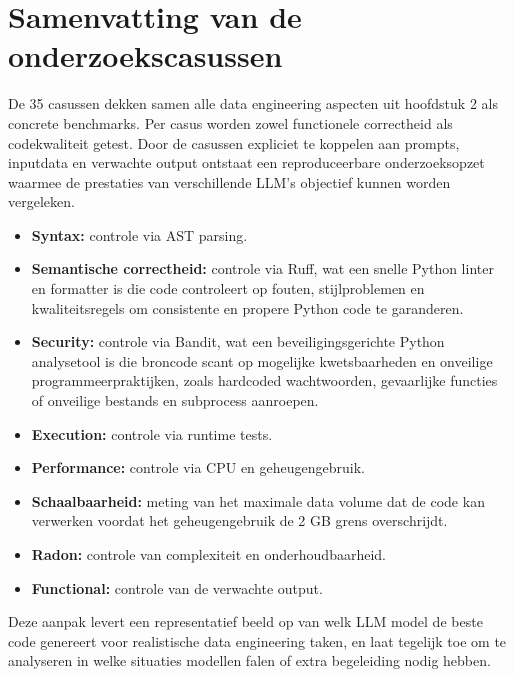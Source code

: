 \section{Samenvatting van de onderzoekscasussen}

De 35 casussen dekken samen alle data engineering aspecten uit hoofdstuk 2 als concrete benchmarks. Per casus worden zowel functionele correctheid als codekwaliteit getest. Door de casussen expliciet te koppelen aan prompts, inputdata en verwachte output ontstaat een reproduceerbare onderzoeksopzet waarmee de prestaties van verschillende LLM's objectief kunnen worden vergeleken. 

\begin{itemize}
\item \textbf{Syntax:} controle via AST parsing.
\item \textbf{Semantische correctheid:} controle via Ruff, wat een snelle Python linter en formatter is die code controleert op fouten, stijlproblemen en kwaliteitsregels om consistente en propere Python code te garanderen.
\item \textbf{Security:} controle via Bandit, wat een beveiligingsgerichte Python analysetool is die broncode scant op mogelijke kwetsbaarheden en onveilige programmeerpraktijken, zoals hardcoded wachtwoorden, gevaarlijke functies of onveilige bestands en subprocess aanroepen.
\item \textbf{Execution:} controle via runtime tests.
\item \textbf{Performance:} controle via CPU en geheugengebruik.
\item \textbf{Schaalbaarheid:} meting van het maximale data volume dat de code kan verwerken voordat het geheugengebruik de 2 GB grens overschrijdt.
\item \textbf{Radon:} controle van complexiteit en onderhoudbaarheid.
\item \textbf{Functional:} controle van de verwachte output.
\end{itemize}

Deze aanpak levert een representatief beeld op van welk LLM model de beste code genereert voor realistische data engineering taken, en laat tegelijk toe om te analyseren in welke situaties modellen falen of extra begeleiding nodig hebben.




